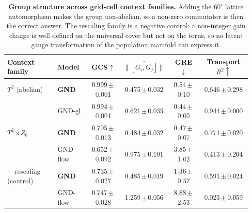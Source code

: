 \begin{table}[t]
\centering
\caption{\textbf{Group structure across grid-cell context families.} Adding the $60^\circ$ lattice automorphism makes the group non-abelian, so a non-zero commutator is then the correct answer. The rescaling family is a negative control: a non-integer gain change is well defined on the universal cover but not on the torus, so no latent gauge transformation of the population manifold can express it.}
\label{tab:grid-families}
\vspace{2pt}
\small
\begin{tabular}{llcccc}
\toprule
Context family & Model & GCS$\uparrow$ & $\overline{\|[G_i,G_j]\|}$ & GRE$\downarrow$ & Transport $R^2\!\uparrow$ \\
\midrule
$T^2$ (abelian) & \textbf{GND} & 0.999\,\tiny{$\pm$\,0.001} & 0.475\,\tiny{$\pm$\,0.032} & 0.54\,\tiny{$\pm$\,0.10} & 0.646\,\tiny{$\pm$\,0.298} \\
 & GND-gl & 0.994\,\tiny{$\pm$\,0.001} & 0.621\,\tiny{$\pm$\,0.035} & 0.44\,\tiny{$\pm$\,0.00} & 0.944\,\tiny{$\pm$\,0.000} \\
\midrule
$T^2\rtimes Z_6$ & \textbf{GND} & 0.705\,\tiny{$\pm$\,0.013} & 0.484\,\tiny{$\pm$\,0.032} & 0.47\,\tiny{$\pm$\,0.07} & 0.771\,\tiny{$\pm$\,0.020} \\
 & GND-flow & 0.652\,\tiny{$\pm$\,0.092} & 0.975\,\tiny{$\pm$\,0.101} & 3.85\,\tiny{$\pm$\,1.62} & 0.413\,\tiny{$\pm$\,0.204} \\
\midrule
$+$ rescaling (control) & \textbf{GND} & 0.735\,\tiny{$\pm$\,0.027} & 0.485\,\tiny{$\pm$\,0.019} & 1.36\,\tiny{$\pm$\,0.57} & 0.591\,\tiny{$\pm$\,0.024} \\
 & GND-flow & 0.747\,\tiny{$\pm$\,0.028} & 1.259\,\tiny{$\pm$\,0.056} & 8.88\,\tiny{$\pm$\,2.53} & 0.023\,\tiny{$\pm$\,0.059} \\
\bottomrule
\end{tabular}
\end{table}
